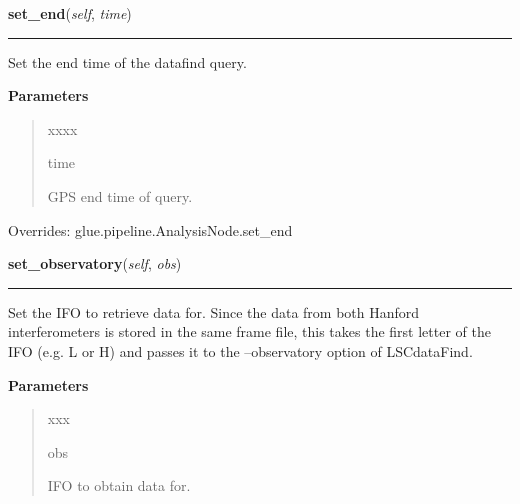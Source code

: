     \begin{boxedminipage}{\textwidth}

    \raggedright \textbf{set\_end}(\textit{self}, \textit{time})

    \vspace{-1.5ex}

    \rule{\textwidth}{0.5\fboxrule}
    Set the end time of the datafind query.

    \vspace{1ex}

      \textbf{Parameters}
      \begin{quote}
        \begin{Ventry}{xxxx}

          \item[time]

          GPS end time of query.

        \end{Ventry}

      \end{quote}

    \vspace{1ex}

      Overrides: glue.pipeline.AnalysisNode.set\_end

    \end{boxedminipage}

    \label{stochastic:LSCDataFindNode:set_observatory}
    \vspace{0.5ex}

    \begin{boxedminipage}{\textwidth}

    \raggedright \textbf{set\_observatory}(\textit{self}, \textit{obs})

    \vspace{-1.5ex}

    \rule{\textwidth}{0.5\fboxrule}
    Set the IFO to retrieve data for. Since the data from both Hanford 
    interferometers is stored in the same frame file, this takes the 
    first letter of the IFO (e.g. L or H) and passes it to the 
    --observatory option of LSCdataFind.

    \vspace{1ex}

      \textbf{Parameters}
      \begin{quote}
        \begin{Ventry}{xxx}

          \item[obs]

          IFO to obtain data for.

        \end{Ventry}

      \end{quote}

    \vspace{1ex}

    \end{boxedminipage}

